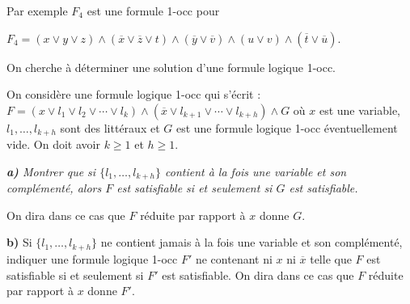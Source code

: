 Par exemple $F_4$ est une formule 1-occ pour

$F_4 = (x \lor y \lor z) \land (\overline x \lor \overline z \lor t) \land (\overline y \lor \overline v) \land (u \lor v) \land (\overline t \lor \overline u)$.

On cherche à déterminer une solution d’une formule logique 1-occ.

\medskip
On considère une formule logique 1-occ qui s’écrit :
$F = (x \lor l_1 \lor l_2 \lor \cdots \lor l_k ) \land (\overline x \lor l_{k + 1} \lor \cdots \lor l_ {k + h} ) \land G$ où $x$ est une variable, $l_1, \ldots,l_{k + h}$ sont des littéraux et $G$ est une formule logique 1-occ éventuellement vide. On doit avoir $k \ge 1$ et $h \ge 1$.

\begin{Exercise}\it
{\bf a)}  Montrer que si $\{l_1, \ldots,l_{k + h}\}$ contient à la fois une variable et son complémenté, alors $F$ est satisfiable si et seulement si $G$ est satisfiable.
 
 On dira dans ce cas que $F$ réduite par rapport à $x$ donne $G$.
 
{\bf b)}  Si $\{l_1, \ldots,l_{k + h}\}$ ne contient jamais à la fois une variable et son complémenté, indiquer une formule logique 1-occ $F'$ ne contenant ni $x$ ni $\overline x$ telle que $F$ est satisfiable si et seulement si $F'$ est satisfiable. On dira dans ce cas que $F$ réduite par rapport à $x$ donne $F'$.
\end{Exercise}
